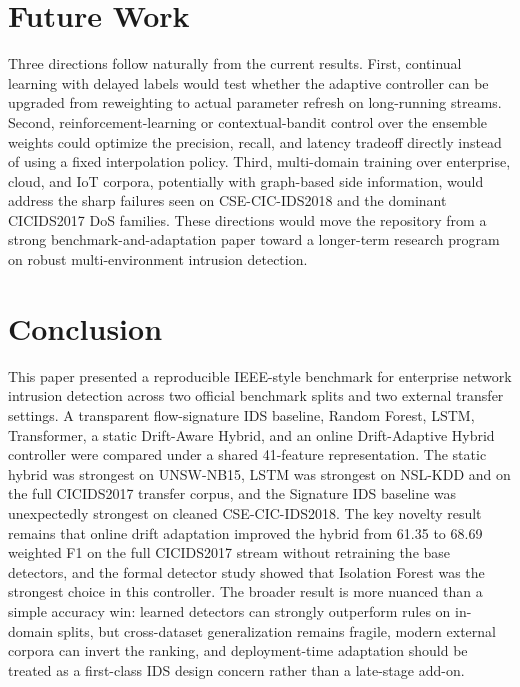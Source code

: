 \documentclass[conference]{IEEEtran}
\begin{document}
\section{Future Work}
Three directions follow naturally from the current results. First, continual learning with delayed labels would test whether the adaptive controller can be upgraded from reweighting to actual parameter refresh on long-running streams. Second, reinforcement-learning or contextual-bandit control over the ensemble weights could optimize the precision, recall, and latency tradeoff directly instead of using a fixed interpolation policy. Third, multi-domain training over enterprise, cloud, and IoT corpora, potentially with graph-based side information, would address the sharp failures seen on CSE-CIC-IDS2018 and the dominant CICIDS2017 DoS families. These directions would move the repository from a strong benchmark-and-adaptation paper toward a longer-term research program on robust multi-environment intrusion detection.

\section{Conclusion}
This paper presented a reproducible IEEE-style benchmark for enterprise network intrusion detection across two official benchmark splits and two external transfer settings. A transparent flow-signature IDS baseline, Random Forest, LSTM, Transformer, a static Drift-Aware Hybrid, and an online Drift-Adaptive Hybrid controller were compared under a shared 41-feature representation. The static hybrid was strongest on UNSW-NB15, LSTM was strongest on NSL-KDD and on the full CICIDS2017 transfer corpus, and the Signature IDS baseline was unexpectedly strongest on cleaned CSE-CIC-IDS2018. The key novelty result remains that online drift adaptation improved the hybrid from 61.35 to 68.69 weighted F1 on the full CICIDS2017 stream without retraining the base detectors, and the formal detector study showed that Isolation Forest was the strongest choice in this controller. The broader result is more nuanced than a simple accuracy win: learned detectors can strongly outperform rules on in-domain splits, but cross-dataset generalization remains fragile, modern external corpora can invert the ranking, and deployment-time adaptation should be treated as a first-class IDS design concern rather than a late-stage add-on.

\balance


\end{document}
